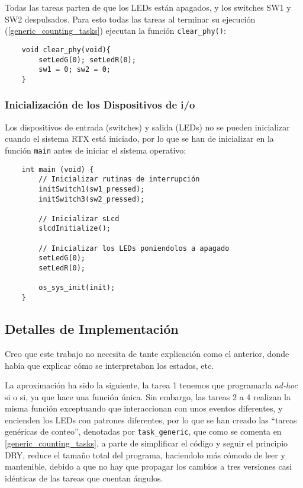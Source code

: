 \documentclass[a4paper,openright,12pt]{article}
\begin{document}
Todas las tareas parten de que los LEDs están apagados, y los switches SW1 y SW2 despulsados. Para esto todas las tareas al terminar su ejecución (\ref{generic_counting_tasks})
ejecutan la función \texttt{clear\_phy()}:
\begin{samepage}
\begin{verbatim}
    void clear_phy(void){
        setLedG(0); setLedR(0);
        sw1 = 0; sw2 = 0;
    }
\end{verbatim}
\end{samepage}

\subsubsection{Inicialización de los Dispositivos de i/o}
Los dispositivos de entrada (switches) y salida (LEDs) no se pueden inicializar cuando el sistema RTX está iniciado, por lo que se han de inicializar en la función \texttt{main} antes
de iniciar el sistema operativo:
\begin{verbatim}
    int main (void) {
        // Inicializar rutinas de interrupción
        initSwitch1(sw1_pressed);
        initSwitch3(sw2_pressed);
        
        // Inicializar sLcd
        slcdInitialize();
        
        // Inicializar los LEDs poniendolos a apagado
        setLedG(0);
        setLedR(0);
        
        os_sys_init(init);
    }
\end{verbatim}



\subsection{Detalles de Implementación}
Creo que este trabajo no necesita de tante explicación como el anterior, donde había que explicar cómo se interpretaban los estados, etc.

La aproximación ha sido la siguiente, la tarea 1 tenemos que programarla \emph{ad-hoc} si o si, ya que hace una función única. Sin embargo, las tareas 2 a 4 realizan la misma función
exceptuando que interaccionan con unos eventos diferentes, y encienden los LEDs con patrones diferentes, por lo que se han creado las ``tareas genéricas de conteo'', denotadas por
\texttt{task\_generic}, que como se comenta en \ref{generic_counting_tasks}, a parte de simplificar el código y seguir el principio DRY, reduce el tamaño total del programa, haciendolo
más cómodo de leer y mantenible, debido a que no hay que propagar los cambios a tres versiones casi idénticas de las tareas que cuentan ángulos.
\end{document}
